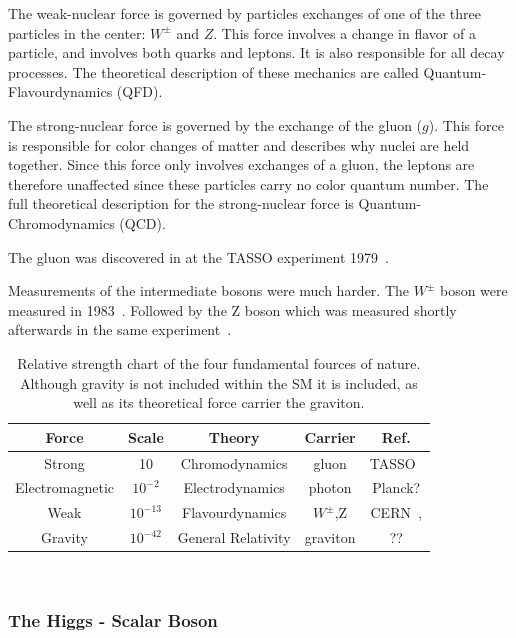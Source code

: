The weak-nuclear force is governed by particles exchanges of one of the three particles in the center: $W^{\pm}$ and $Z$.
This force involves a change in flavor of a particle, and involves both quarks and leptons.
It is also responsible for all decay processes.
The theoretical description of these mechanics are called Quantum-Flavourdynamics (QFD).

The strong-nuclear force is governed by the exchange of the gluon ($g$).
This force is responsible for color changes of matter and describes why nuclei are held together.
Since this force only involves exchanges of a gluon, the leptons are therefore unaffected since these particles carry no color quantum number.
The full theoretical description for the strong-nuclear force is Quantum-Chromodynamics (QCD).

The gluon was discovered in at the TASSO experiment 1979~\citep{tasso_1978_BRANDELIK1979243, PETRA_PhysRevLett.43.830}.

Measurements of the intermediate bosons were much harder.
The $W^{\pm}$ boson were measured in 1983~\citep{wboson_measure_ARNISON1983103}.
Followed by the Z boson which was measured shortly afterwards in the same experiment~\citep{zboson_measure_1983398}.

\begin{table}
\begin{center}
\begin{tabular}{||c c c c c||}
 \hline
 Force & Scale & Theory & Carrier & Ref. \\ [0.5ex]
 \hline\hline
 Strong & 10 & Chromodynamics & gluon & TASSO~\citep{tasso_1978_BRANDELIK1979243} \\
 \hline
 Electromagnetic & $10^{-2} $ & Electrodynamics & photon & Planck? \\
 \hline
 Weak & $10^{-13}$ & Flavourdynamics & $W^{\pm}$,Z & CERN~\citep{wboson_measure_ARNISON1983103},\citep{zboson_measure_1983398}\\
 \hline
 Gravity & $10^{-42}$ & General Relativity & graviton  & ?? \\
 \hline
 \hline
\end{tabular}
\caption{Relative strength chart of the four fundamental fources of nature. Although gravity is not included within the SM it is included, as well as its theoretical force carrier the graviton.}
\end{center}
\end{table}
~\label{table:forces}

\subsubsection{The Higgs - Scalar Boson}

